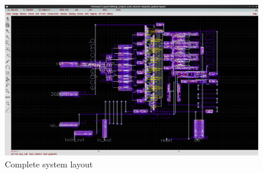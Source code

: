 \documentclass[a4paper,12pt]{article} \usepackage{graphicx}
\begin{document}
\begin{figure}[h]
  \centering
  \includegraphics[width=1.0\textwidth]{../Bilder/Layout/complete_system.png}
  \caption{Complete system layout}
  \label{fig:LD}
\end{figure}
\end{document}
